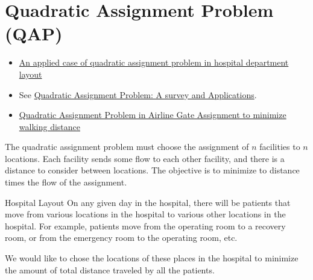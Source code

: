 \section{Quadratic Assignment Problem (QAP)}
\begin{resource}{}{}
\begin{itemize}
\item \href{https://ieeexplore-ieee-org.ezproxy.lib.vt.edu/stamp/stamp.jsp?tp=&arnumber=7170278}{An applied case of quadratic assignment problem in hospital department layout}
\item See \href{https://www.semanticscholar.org/paper/Quadratic-Assignment-Problem%3A-A-survey-and-Shawky-Metwally/247b45613d6d3b6961fdad44f9e7fefb70fd3e82}{Quadratic Assignment Problem: A survey and Applications}.
\item \href{https://vtechworks.lib.vt.edu/server/api/core/bitstreams/06b13a4f-d1a9-452c-957f-b0bdd1619c76/content}{Quadratic Assignment Problem in Airline Gate Assignment to minimize walking distance}
\end{itemize}
\end{resource}
The quadratic assignment problem must choose the assignment of $n$ facilities to $n$ locations.  Each facility sends some flow to each other facility, and there is a distance to consider between locations.   
The objective is to minimize to distance times the flow of the assignment.


\begin{example}{Hospital Layout}{}
On any given day in the hospital, there will be patients that move from various locations in the hospital to various other locations in the hospital.  For example, patients move from the operating room to a recovery room, or from the emergency room to the operating room, etc.

We would like to chose the locations of these places in the hospital to minimize the amount of total distance traveled by all the patients.
\end{example}






